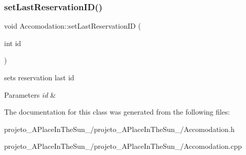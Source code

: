 \subsubsection{\texorpdfstring{set\+Last\+Reservation\+I\+D()}{setLastReservationID()}}
{\footnotesize\ttfamily void Accomodation\+::set\+Last\+Reservation\+ID (\begin{DoxyParamCaption}\item[{int}]{id }\end{DoxyParamCaption})\hspace{0.3cm}{\ttfamily [inline]}}



sets reservation last id 


\begin{DoxyParams}{Parameters}
{\em id} & \\
\hline
\end{DoxyParams}


The documentation for this class was generated from the following files\+:\begin{DoxyCompactItemize}
\item 
projeto\+\_\+\+A\+Place\+In\+The\+Sun\+\_/projeto\+\_\+\+A\+Place\+In\+The\+Sun\+\_/Accomodation.\+h\item 
projeto\+\_\+\+A\+Place\+In\+The\+Sun\+\_/projeto\+\_\+\+A\+Place\+In\+The\+Sun\+\_/Accomodation.\+cpp\end{DoxyCompactItemize}
